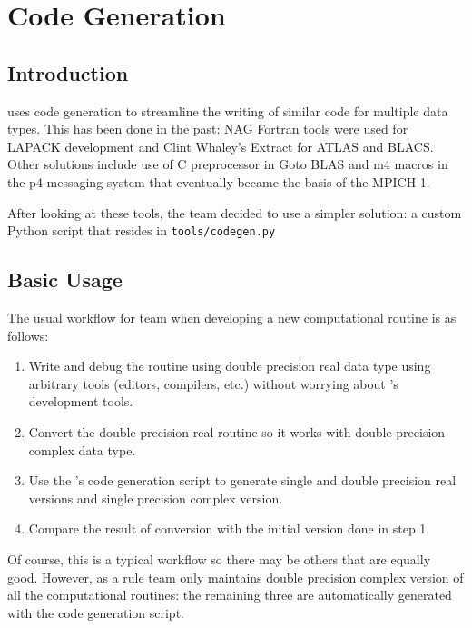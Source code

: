 
\chapter{Code Generation}


\section{Introduction}

\PLASMA uses code generation to streamline the writing of similar code for multiple data
types. This has been done in the past: NAG Fortran tools were used for LAPACK development
and Clint Whaley's Extract for ATLAS and BLACS. Other solutions include use of C
preprocessor in Goto BLAS and m4 macros in the p4 messaging system that eventually
became the basis of the MPICH 1.

After looking at these tools, the \PLASMA team decided to use a simpler solution:
a custom Python script that resides in \texttt{tools/codegen.py}

\section{Basic Usage}
The usual workflow for \PLASMA team when developing a new computational routine is
as follows:
\begin{enumerate}
\item Write and debug the routine using double precision real data type using arbitrary
tools (editors, compilers, etc.) without worrying about \PLASMA's development tools.
\item Convert the double precision real routine so it works with double precision complex
data type.
\item Use the \PLASMA's code generation script to generate single and double precision
real versions and single precision complex version.
\item Compare the result of conversion with the initial version done in step 1.
\end{enumerate}

Of course, this is a typical workflow so there may be others that are equally good.
However, as a rule \PLASMA team only maintains double precision complex version
of all the computational routines: the remaining three are automatically generated
with the code generation script.


